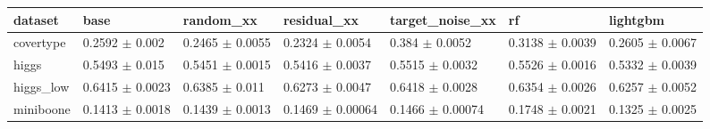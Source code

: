 \begin{tabular}{lllllll}
\toprule
dataset & base & random\_xx & residual\_xx & target\_noise\_xx & rf & lightgbm \\
\midrule
covertype & 0.2592 $\pm$ 0.002 & 0.2465 $\pm$ 0.0055 & 0.2324 $\pm$ 0.0054 & 0.384 $\pm$ 0.0052 & 0.3138 $\pm$ 0.0039 & 0.2605 $\pm$ 0.0067 \\
higgs & 0.5493 $\pm$ 0.015 & 0.5451 $\pm$ 0.0015 & 0.5416 $\pm$ 0.0037 & 0.5515 $\pm$ 0.0032 & 0.5526 $\pm$ 0.0016 & 0.5332 $\pm$ 0.0039 \\
higgs\_low & 0.6415 $\pm$ 0.0023 & 0.6385 $\pm$ 0.011 & 0.6273 $\pm$ 0.0047 & 0.6418 $\pm$ 0.0028 & 0.6354 $\pm$ 0.0026 & 0.6257 $\pm$ 0.0052 \\
miniboone & 0.1413 $\pm$ 0.0018 & 0.1439 $\pm$ 0.0013 & 0.1469 $\pm$ 0.00064 & 0.1466 $\pm$ 0.00074 & 0.1748 $\pm$ 0.0021 & 0.1325 $\pm$ 0.0025 \\
\bottomrule
\end{tabular}
